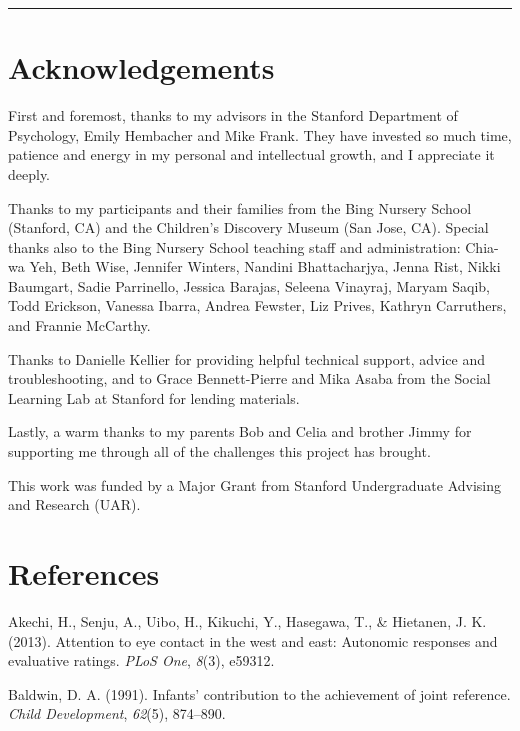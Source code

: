 \documentclass[floatsintext,man]{apa6}
\theoremstyle{definition}
\theoremstyle{definition}
\theoremstyle{definition}
\theoremstyle{remark}
\begin{document}
\begin{center}\rule{0.5\linewidth}{\linethickness}\end{center}

\section{Acknowledgements}\label{acknowledgements}

First and foremost, thanks to my advisors in the Stanford Department of
Psychology, Emily Hembacher and Mike Frank. They have invested so much
time, patience and energy in my personal and intellectual growth, and I
appreciate it deeply.

Thanks to my participants and their families from the Bing Nursery
School (Stanford, CA) and the Children's Discovery Museum (San Jose,
CA). Special thanks also to the Bing Nursery School teaching staff and
administration: Chia-wa Yeh, Beth Wise, Jennifer Winters, Nandini
Bhattacharjya, Jenna Rist, Nikki Baumgart, Sadie Parrinello, Jessica
Barajas, Seleena Vinayraj, Maryam Saqib, Todd Erickson, Vanessa Ibarra,
Andrea Fewster, Liz Prives, Kathryn Carruthers, and Frannie McCarthy.

Thanks to Danielle Kellier for providing helpful technical support,
advice and troubleshooting, and to Grace Bennett-Pierre and Mika Asaba
from the Social Learning Lab at Stanford for lending materials.

Lastly, a warm thanks to my parents Bob and Celia and brother Jimmy for
supporting me through all of the challenges this project has brought.

This work was funded by a Major Grant from Stanford Undergraduate
Advising and Research (UAR).

\newpage

\section{References}\label{references}

\setlength{\parindent}{-0.5in} \setlength{\leftskip}{0.5in}

\hypertarget{refs}{}
\hypertarget{ref-akechi2013attention}{}
Akechi, H., Senju, A., Uibo, H., Kikuchi, Y., Hasegawa, T., \& Hietanen,
J. K. (2013). Attention to eye contact in the west and east: Autonomic
responses and evaluative ratings. \emph{PLoS One}, \emph{8}(3), e59312.

\hypertarget{ref-baldwin1991infants}{}
Baldwin, D. A. (1991). Infants' contribution to the achievement of joint
reference. \emph{Child Development}, \emph{62}(5), 874--890.
\end{document}
